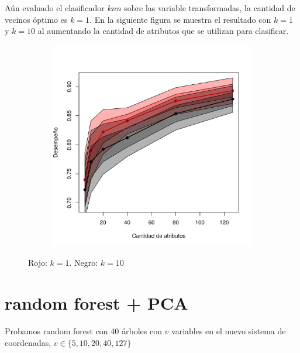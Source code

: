 \documentclass[a4paper,10pt]{article}
\begin{document}
A\'un evaluado el clasificador $knn$ sobre las variable transformadas, la cantidad de vecinos \'optimo es $k=1$. En la siguiente figura se muestra el resultado con $k=1$ y $k=10$ al aumentando la cantidad de atributos que se utilizan para clasificar.  

\begin{figure}[H]
  \centering
  \begin{subfigure}[b]{0.4\textwidth}
    \includegraphics[width=\textwidth]{../imagenes/knn}
  \end{subfigure}
  \caption{Rojo: $k=1$. Negro: $k=10$ }
  \label{fig:knn-n_neighbors}
\end{figure}

\section{random forest + PCA}

Probamos random forest con 40 \'arboles con $v$ variables en el nuevo sistema de coordenadas, $v \in \{5,10,20,40,127\}$
\end{document}
